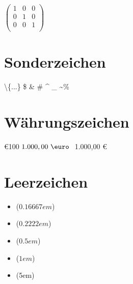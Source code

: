     $
        \left( \begin{array}{rrr}
            1 & 0 & 0 \\                                              
            0 & 1 & 0 \\
            0 & 0 & 1 \\                                              
        \end{array}\right)
    $

\section{Sonderzeichen}
    \textbackslash \{...\} \$ \& \# \textdegree \^{} \_ \textasciitilde \%

\section{Währungszeichen}
    \euro 100   $1.000,00 \text{ \euro }$ 1.000,00 \euro

\section{Leerzeichen}
\begin{itemize} %
    \item[] [a\,b] ($0.16667em$)
    \item[] [a\:b] ($0.2222em$)
    \item[] [a\enspace b] ($0.5em$)
    \item[] [a\quad b] ($1em$)
    \item[] [a\hspace{5em} b] (5em)
\end{itemize}

\newpage
